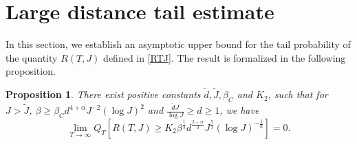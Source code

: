 \documentclass[12pt]{amsart}
\newtheorem{prop}{Proposition}[section]
\numberwithin{equation}{section}
\newcommand{\1}{\mathbf{1}}
\begin{document}
\section{Large distance tail estimate}
\label{Large distance tail estimate}
In this section, we establish an asymptotic upper bound for the tail probability of the quantity $R(T,J)$ defined in \eqref{RTJ}. The result is formalized in the following proposition.
\begin{prop}
\label{upper}
    There exist positive constants $\tilde{d}, \tilde{J}, \beta_C$ and $K_2$, such that for $J>\tilde{J}$, $\beta \geq\beta_Cd^{4+\alpha}J^{-2}(\log J)^{2}$ and $\frac{\tilde{d}J}{\log J}\geq d\geq 1$, we have
\begin{equation*}
    \lim_{T\to\infty}Q_T\left[R(T,J)\geq K_2\beta^{\frac{1}{3}}d^{\frac{2-\alpha}{3}}J^{\frac{5}{3}}(\log J)^{-\frac{1}{6}}\right] = 0.
\end{equation*}
\end{prop}
\end{document}
